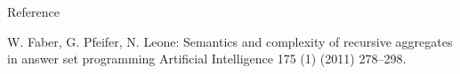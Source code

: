 \documentclass{beamer}
\begin{document}
\begin{frame}{Reference}

	\begin{thebibliography}{11}

	\small

	\beamertemplatearticlebibitems
%
%
%
%

		W. Faber, G. Pfeifer, N. Leone:
		\newblock Semantics and complexity of recursive aggregates in answer set programming
		\newblock Artificial Intelligence 175 (1) (2011) 278–298.

	\end{thebibliography}
%
%
%
%
%
%

\end{frame}
\end{document}
